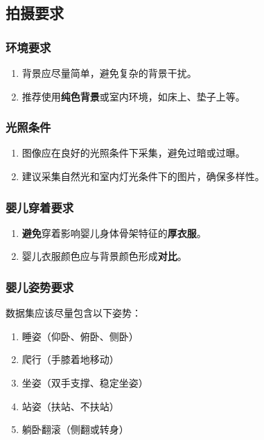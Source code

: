 \subsection{拍摄要求}

\subsubsection{环境要求}

\begin{enumerate}
    \item 背景应尽量简单，避免复杂的背景干扰。
    \item 推荐使用\textbf{纯色背景}或室内环境，如床上、垫子上等。
\end{enumerate}

\subsubsection{光照条件}

\begin{enumerate}
    \item 图像应在良好的光照条件下采集，避免过暗或过曝。
    \item 建议采集自然光和室内灯光条件下的图片，确保多样性。
\end{enumerate}

\subsubsection{婴儿穿着要求}

\begin{enumerate}
    \item \textbf{避免}穿着影响婴儿身体骨架特征的\textbf{厚衣服}。
    \item 婴儿衣服颜色应与背景颜色形成\textbf{对比}。
\end{enumerate}

\subsubsection{婴儿姿势要求}

数据集应该尽量包含以下姿势：

\begin{enumerate}
    \item 睡姿（仰卧、俯卧、侧卧）
    \item 爬行（手膝着地移动）
    \item 坐姿（双手支撑、稳定坐姿）
    \item 站姿（扶站、不扶站）
    \item 躺卧翻滚（侧翻或转身）
\end{enumerate}

